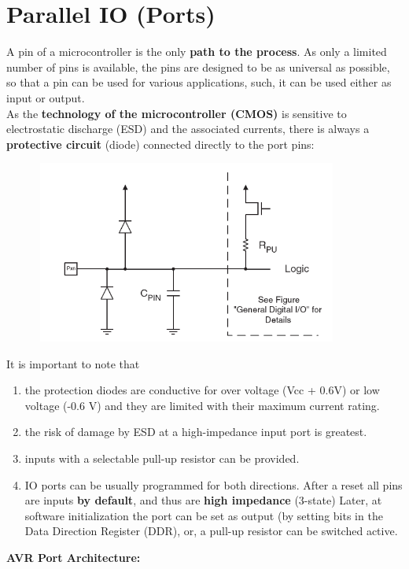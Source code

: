 \section{Parallel IO (Ports)}

A pin of a microcontroller is the only \textbf{path to the process}. As only a limited number of pins is  available, the pins are designed to be as universal as possible, so that a pin can be used for various applications, such, it can be used either as input or output.\\

As the \textbf{technology of the microcontroller (CMOS)} is sensitive to electrostatic discharge (ESD) and the associated currents, there is always a \textbf{protective circuit} (diode) connected directly to the port pins:

    \begin{figure}[h]
    \centering
    \includegraphics[width=10cm, height=6cm]{Images/image51.png}
    \label{fig:Fig 148}
    \end{figure}

It is important to note that

\begin{enumerate}
\item  the protection diodes are conductive for over voltage (Vcc + 0.6V) or low voltage (-0.6 V) and they are limited with their maximum current rating.
\item  the risk of damage by ESD at a high-impedance input port is greatest.
\item  inputs with a selectable pull-up resistor can be provided.
\item  IO ports can be usually programmed for both directions. After a reset all pins are inputs \textbf{by default}, and thus are \textbf{high impedance} (3-state) Later, at software initialization the port can be set as output (by setting bits in the Data Direction Register (DDR),  or, a pull-up resistor can be switched active.
\end{enumerate}
\newpage
{\rot\bf AVR Port Architecture:}

